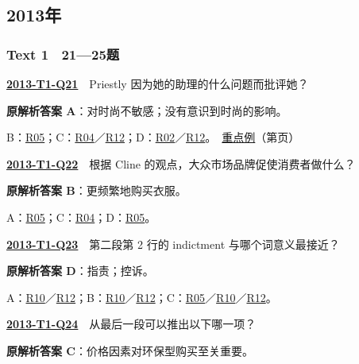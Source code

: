 \documentclass[11pt,a4paper]{article}
\begin{document}
\subsection{2013年}\label{year-2013}
\subsubsection{Text 1　21—25题}
\label{idx-2013-T1-Q21}\noindent\textbf{\href{https://zj139.github.io/math-notes/english/e12e6c6712b9ddb12ecc7057/\#q21}{2013-T1-Q21}}　Priestly 因为她的助理的什么问题而批评她？\par\nopagebreak
\noindent\textbf{原解析答案 A}：对时尚不敏感；没有意识到时尚的影响。\par\nopagebreak
\noindent B：\hyperref[cat-R05]{R05}；C：\hyperref[cat-R04]{R04}／\hyperref[cat-R12]{R12}；D：\hyperref[cat-R02]{R02}／\hyperref[cat-R12]{R12}。　\hyperref[case-2013-T1-Q21]{重点例}（第\pageref{case-2013-T1-Q21}页）\par\smallskip
{}\label{idx-2013-T1-Q22}\noindent\textbf{\href{https://zj139.github.io/math-notes/english/e12e6c6712b9ddb12ecc7057/\#q22}{2013-T1-Q22}}　根据 Cline 的观点，大众市场品牌促使消费者做什么？\par\nopagebreak
\noindent\textbf{原解析答案 B}：更频繁地购买衣服。\par\nopagebreak
\noindent A：\hyperref[cat-R05]{R05}；C：\hyperref[cat-R04]{R04}；D：\hyperref[cat-R05]{R05}。\par\smallskip
{}\label{idx-2013-T1-Q23}\noindent\textbf{\href{https://zj139.github.io/math-notes/english/e12e6c6712b9ddb12ecc7057/\#q23}{2013-T1-Q23}}　第二段第 2 行的 indictment 与哪个词意义最接近？\par\nopagebreak
\noindent\textbf{原解析答案 D}：指责；控诉。\par\nopagebreak
\noindent A：\hyperref[cat-R10]{R10}／\hyperref[cat-R12]{R12}；B：\hyperref[cat-R10]{R10}／\hyperref[cat-R12]{R12}；C：\hyperref[cat-R05]{R05}／\hyperref[cat-R10]{R10}／\hyperref[cat-R12]{R12}。\par\smallskip
{}\label{idx-2013-T1-Q24}\noindent\textbf{\href{https://zj139.github.io/math-notes/english/e12e6c6712b9ddb12ecc7057/\#q24}{2013-T1-Q24}}　从最后一段可以推出以下哪一项？\par\nopagebreak
\noindent\textbf{原解析答案 C}：价格因素对环保型购买至关重要。\par\nopagebreak
\end{document}
